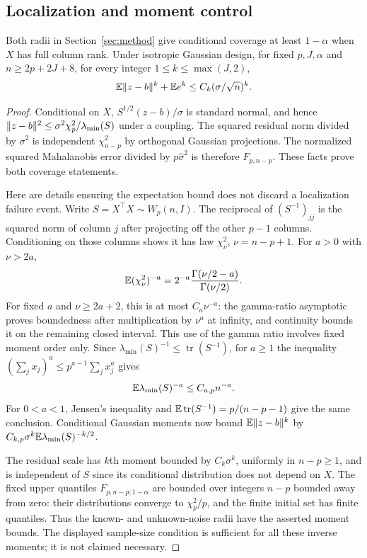 \subsection{Localization and moment control}
\begin{lemma}\label{lem:OLS}
Both radii in Section~\ref{sec:method} give conditional coverage at least $1-\alpha$ when $X$ has full column rank. Under isotropic Gaussian design, for fixed $p,J,\alpha$ and $n\ge2p+2J+8$, for every integer $1\le k\le\max(J,2)$,
\[
 \mathbb E\lVert z-b\rVert^k+\mathbb E e^k\le C_k(\sigma/\sqrt n)^k.
\]
\end{lemma}
\begin{proof}
Conditional on $X$, $S^{1/2}(z-b)/\sigma$ is standard normal, and hence $\lVert z-b\rVert^2\le\sigma^2\chi_p^2/\lambda_{\min}(S)$ under a coupling. The squared residual norm divided by $\sigma^2$ is independent $\chi^2_{n-p}$ by orthogonal Gaussian projections. The normalized squared Mahalanobis error divided by $p\widehat\sigma^2$ is therefore $F_{p,n-p}$. These facts prove both coverage statements.

Here are details ensuring the expectation bound does not discard a localization failure event. Write $S=X^\top X\sim W_p(n,I)$. The reciprocal of $(S^{-1})_{jj}$ is the squared norm of column $j$ after projecting off the other $p-1$ columns. Conditioning on those columns shows it has law $\chi^2_{\nu}$, $\nu=n-p+1$. For $a>0$ with $\nu>2a$,
\[
 \mathbb E(\chi_\nu^2)^{-a}=2^{-a}\frac{\Gamma(\nu/2-a)}{\Gamma(\nu/2)}.
\]
For fixed $a$ and $\nu\ge2a+2$, this is at most $C_a\nu^{-a}$: the gamma-ratio asymptotic proves boundedness after multiplication by $\nu^a$ at infinity, and continuity bounds it on the remaining closed interval. This use of the gamma ratio involves fixed moment order only. Since $\lambda_{\min}(S)^{-1}\le\operatorname{tr}(S^{-1})$, for $a\ge1$ the inequality $(\sum_jx_j)^a\le p^{a-1}\sum_jx_j^a$ gives
\[
 \mathbb E\lambda_{\min}(S)^{-a}\le C_{a,p}n^{-a}.
\]
For $0<a<1$, Jensen's inequality and $\mathbb E\operatorname{tr}(S^{-1})=p/(n-p-1)$ give the same conclusion. Conditional Gaussian moments now bound $\mathbb E\lVert z-b\rVert^k$ by $C_{k,p}\sigma^k\mathbb E\lambda_{\min}(S)^{-k/2}$.

The residual scale has $k$th moment bounded by $C_k\sigma^k$, uniformly in $n-p\ge1$, and is independent of $S$ since its conditional distribution does not depend on $X$. The fixed upper quantiles $F_{p,n-p;1-\alpha}$ are bounded over integers $n-p$ bounded away from zero: their distributions converge to $\chi_p^2/p$, and the finite initial set has finite quantiles. Thus the known- and unknown-noise radii have the asserted moment bounds. The displayed sample-size condition is sufficient for all these inverse moments; it is not claimed necessary.
\end{proof}


